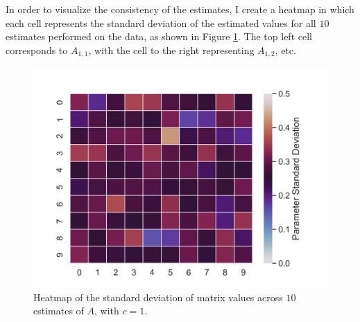 \documentclass[12pt]{article}
\theoremstyle{definition}
\begin{document}
In order to visualize the consistency of the estimates, I create a heatmap in which each cell represents the standard deviation of the estimated values for all $10$ estimates performed on the data, as shown in Figure \ref{fig:heatmapSD}. The top left cell corresponds to $A_{1, 1}$, with the cell to the right representing $A_{1, 2}$, etc. 

\begin{figure}[hbt!]
    \par
    \begin{center}
    \caption{Heatmap of the standard deviation of matrix values across $10$ estimates of $A$, with $c=1$. }
    \label{fig:heatmapSD}
    \includegraphics[scale=0.85]{Figures/heatmap_sd_guesses.png}
    \end{center}
    \par
    \vspace{-0.25in}
    \medskip
\end{figure}

\vspace{-0.5in}
\end{document}

